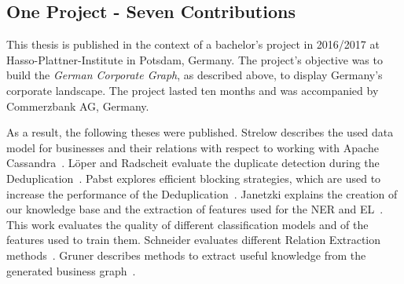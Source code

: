 \subsection*{One Project - Seven Contributions}
This thesis is published in the context of a bachelor's project in 2016/2017 at Hasso-Plattner-Institute in Potsdam, Germany. The project's objective was to build the \emph{German Corporate Graph}, as described above, to display Germany's corporate landscape. The project lasted ten months and was accompanied by Commerzbank AG, Germany.\par
As a result, the following theses were published. Strelow describes the used data model for businesses and their relations with respect to working with Apache Cassandra\ \cite{strelow}. Löper and Radscheit evaluate the duplicate detection during the Deduplication\ \cite{loeperradscheit}. Pabst explores efficient blocking strategies, which are used to increase the performance of the Deduplication\ \cite{pabst}. Janetzki explains the creation of our knowledge base and the extraction of features used for the NER and EL\ \cite{janetzki}. This work evaluates the quality of different classification models and of the features used to train them. Schneider evaluates different Relation Extraction methods\ \cite{schneider}. Gruner describes methods to extract useful knowledge from the generated business graph\ \cite{gruner}.\par
